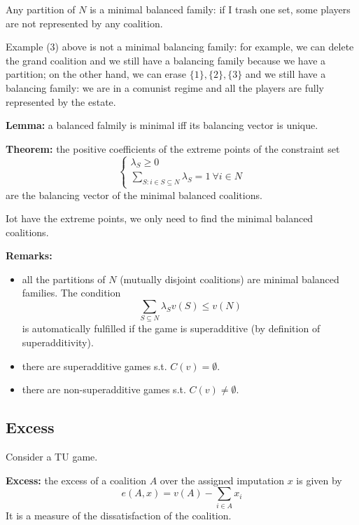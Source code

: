 \bigskip
\noindent Any partition of $N$ is a minimal balanced family: if I trash one set, some players are not represented by any coalition.

\bigskip
\noindent Example (3) above is not a minimal balancing family: for 
example, we can delete the grand coalition and we still have a balancing 
family because we have a partition; on the other hand, we can erase $\{1\}, 
\{2\},\{3\}$ and we still have a balancing family: we are in a comunist 
regime and all the players are fully represented by the estate.

\bigskip
\noindent \textbf{Lemma:} a balanced falmily is minimal iff its balancing vector is unique.

\bigskip
\noindent \textbf{Theorem:} the positive coefficients of the extreme points of the constraint set
\begin{equation*}
	\begin{cases}
		\lambda_S \geq 0\\
		\sum_{S: i \in S \subseteq N}\lambda_S = 1 ~\forall i \in N
	\end{cases}
\end{equation*}
are the balancing vector of the minimal balanced coalitions.

\bigskip
\noindent Iot have the extreme points, we only need to find the minimal 
balanced coalitions.

\bigskip
\noindent \textbf{Remarks:} 
\begin{itemize}
	\item all the partitions of $N$ (mutually disjoint coalitions) are minimal balanced families. The condition 
	\[
		\sum_{S \subseteq N}\lambda_Sv(S) \leq v(N)
	\]
	is automatically fulfilled if the game is superadditive (by definition of superadditivity).
	
	\item there are superadditive games s.t. $C(v) = \emptyset$.
	
	\item there are non-superadditive games s.t. $C(v) \neq \emptyset$.
\end{itemize}

\subsection{Excess}

\noindent Consider a TU game.

\bigskip
\noindent \textbf{Excess:} the excess of a coalition $A$ over the assigned imputation $x$ is given by
\[
	e(A,x) = v(A) - \sum_{i \in A}x_i
\]
It is a measure of the dissatisfaction of the coalition.

